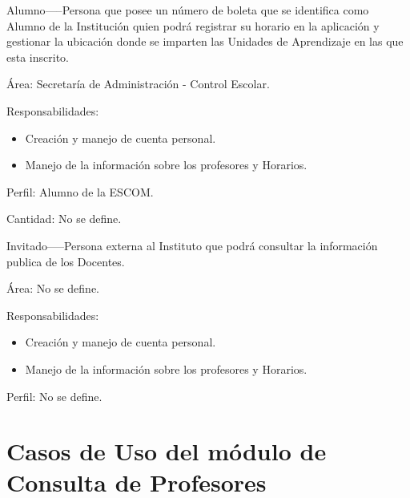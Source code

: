 \begin{actor}{Alumno}{-----}{Persona que posee un número de boleta que se identifica como Alumno de la Institución quien podrá registrar su horario en la aplicación y gestionar la ubicación donde se imparten las Unidades de Aprendizaje en las que esta inscrito.}
	
	\item[Área:] Secretaría de Administración - Control Escolar.
	
	\item[Responsabilidades:] \hspace{1pt}
	
	\begin{itemize}
		\item Creación y manejo de cuenta personal.
		\item Manejo de la información sobre los profesores y Horarios.
	\end{itemize}
	
	\item[Perfil:] Alumno de la ESCOM.

	\item[Cantidad:] No se define.
	
\end{actor}



\begin{actor}{Invitado}{-----}{Persona externa al Instituto que podrá consultar la información publica de los Docentes.}
	
	\item[Área:] No se define.
	
	\item[Responsabilidades:] \hspace{1pt}
	
	\begin{itemize}
		\item Creación y manejo de cuenta personal.
		\item Manejo de la información sobre los profesores y Horarios.
	\end{itemize}
	
	\item[Perfil:] No se define.
	
\end{actor}




\section{Casos de Uso del módulo de Consulta de Profesores}


